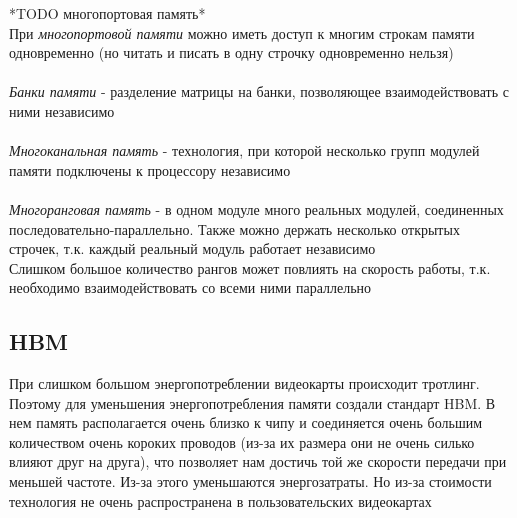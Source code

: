 \documentclass[12pt]{article}
\begin{document}
*TODO многопортовая память*\\
При \textit{многопортовой памяти} можно иметь доступ к многим строкам памяти одновременно (но читать и писать в одну строчку одновременно нельзя)\\\\
\textit{Банки памяти} - разделение матрицы на банки, позволяющее взаимодействовать с ними независимо\\\\
\textit{Многоканальная память} - технология, при которой несколько групп модулей памяти подключены к процессору независимо\\\\
\textit{Многоранговая память} - в одном модуле много реальных модулей, соединенных последовательно-параллельно. Также можно держать несколько открытых строчек, т.к. каждый реальный модуль работает независимо\\
Слишком большое количество рангов может повлиять на скорость работы, т.к. необходимо взаимодействовать со всеми ними параллельно
\subsection{HBM}
При слишком большом энергопотреблении видеокарты происходит тротлинг. Поэтому для уменьшения энергопотребления памяти создали стандарт HBM. В нем память располагается очень близко к чипу и соединяется очень большим количеством очень короких проводов (из-за их размера они не очень силько влияют друг на друга), что позволяет нам достичь той же скорости передачи при меньшей частоте. Из-за этого уменьшаются энергозатраты. Но из-за стоимости технология не очень распространена в пользовательских видеокартах\\
\end{document}
